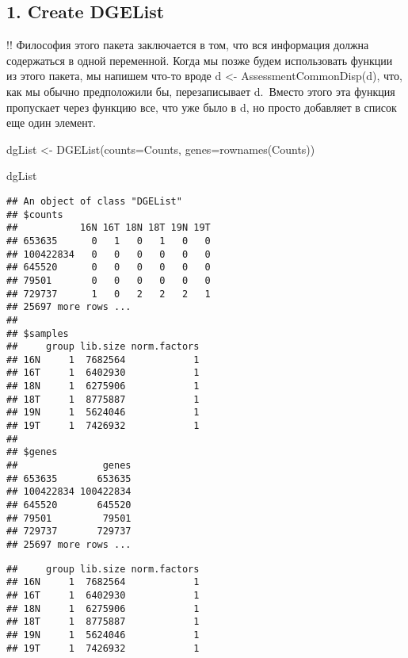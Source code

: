 \documentclass[
]{article}
\newenvironment{Shaded}{\begin{snugshade}}{\end{snugshade}}
\newcommand{\AttributeTok}[1]{\textcolor[rgb]{0.77,0.63,0.00}{#1}}
\newcommand{\FunctionTok}[1]{\textcolor[rgb]{0.00,0.00,0.00}{#1}}
\newcommand{\NormalTok}[1]{#1}
\newcommand{\OtherTok}[1]{\textcolor[rgb]{0.56,0.35,0.01}{#1}}
\newcommand{\SpecialCharTok}[1]{\textcolor[rgb]{0.00,0.00,0.00}{#1}}
\begin{document}
\hypertarget{create-dgelist}{%
\subsection{1. Create DGEList}\label{create-dgelist}}

!! Философия этого пакета заключается в том, что вся информация должна
содержаться в одной переменной. Когда мы позже будем использовать
функции из этого пакета, мы напишем что-то вроде d \textless-
AssessmentCommonDisp(d), что, как мы обычно предположили бы,
перезаписывает d.~Вместо этого эта функция пропускает через функцию все,
что уже было в d, но просто добавляет в список еще один элемент.

\begin{Shaded}
\begin{Highlighting}[]
\NormalTok{dgList }\OtherTok{\textless{}{-}} \FunctionTok{DGEList}\NormalTok{(}\AttributeTok{counts=}\NormalTok{Counts, }\AttributeTok{genes=}\FunctionTok{rownames}\NormalTok{(Counts))}

\NormalTok{dgList}
\end{Highlighting}
\end{Shaded}

\begin{verbatim}
## An object of class "DGEList"
## $counts
##           16N 16T 18N 18T 19N 19T
## 653635      0   1   0   1   0   0
## 100422834   0   0   0   0   0   0
## 645520      0   0   0   0   0   0
## 79501       0   0   0   0   0   0
## 729737      1   0   2   2   2   1
## 25697 more rows ...
## 
## $samples
##     group lib.size norm.factors
## 16N     1  7682564            1
## 16T     1  6402930            1
## 18N     1  6275906            1
## 18T     1  8775887            1
## 19N     1  5624046            1
## 19T     1  7426932            1
## 
## $genes
##               genes
## 653635       653635
## 100422834 100422834
## 645520       645520
## 79501         79501
## 729737       729737
## 25697 more rows ...
\end{verbatim}

\begin{Shaded}
\end{Shaded}

\begin{verbatim}
##     group lib.size norm.factors
## 16N     1  7682564            1
## 16T     1  6402930            1
## 18N     1  6275906            1
## 18T     1  8775887            1
## 19N     1  5624046            1
## 19T     1  7426932            1
\end{verbatim}
\end{document}
